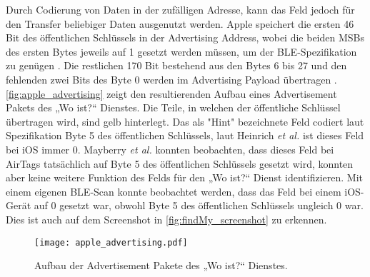 Durch Codierung von Daten in der zufälligen Adresse, kann das Feld jedoch für den Transfer beliebiger Daten ausgenutzt werden.
Apple speichert die ersten 46 Bit des öffentlichen Schlüssels in der Advertising Address, wobei die beiden \acp{MSB} des ersten Bytes jeweils auf 1 gesetzt werden müssen, um der \ac{BLE}-Spezifikation zu genügen \cite{Heinrich_FindMy}.
Die restlichen 170 Bit bestehend aus den Bytes 6 bis 27 und den fehlenden zwei Bits des Byte 0 werden im Advertising Payload übertragen \cite{Apple_FindMySpec}.
\autoref{fig:apple_advertising} zeigt den resultierenden Aufbau eines Advertisement Pakets des „Wo ist?“ Dienstes.
Die Teile, in welchen der öffentliche Schlüssel übertragen wird, sind gelb hinterlegt.
Das als "Hint" bezeichnete Feld codiert laut Spezifikation \cite{Apple_FindMySpec} Byte 5 des öffentlichen Schlüssels, laut Heinrich \textit{et al.} \cite{Heinrich_FindMy} ist dieses Feld bei iOS immer 0.
Mayberry \textit{et al.} \cite{Mayberry_Tracking} konnten beobachten, dass dieses Feld bei AirTags tatsächlich auf Byte 5 des öffentlichen Schlüssels gesetzt wird, konnten aber keine weitere Funktion des Felds für den „Wo ist?“ Dienst identifizieren.
Mit einem eigenen \ac{BLE}-Scan konnte beobachtet werden, dass das Feld bei einem iOS-Gerät auf 0 gesetzt war, obwohl Byte 5 des öffentlichen Schlüssels ungleich 0 war.
Dies ist auch auf dem Screenshot in \autoref{fig:findMy_screenshot} zu erkennen.
\begin{figure}
    \centering
    \texttt{[image: apple\_advertising.pdf]}
    \caption{Aufbau der Advertisement Pakete des „Wo ist?“ Dienstes.}
    \label{fig:apple_advertising}
\end{figure}

